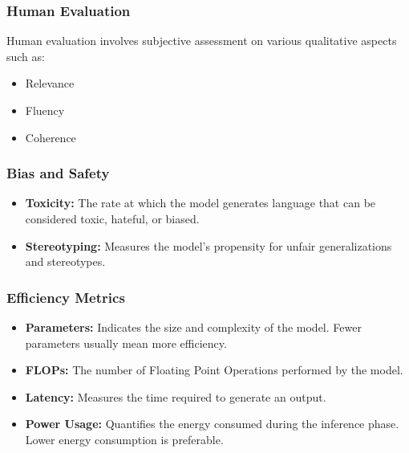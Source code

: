 \subsubsection{Human Evaluation}

Human evaluation involves subjective assessment on various qualitative aspects such as:

\begin{itemize}
    \item Relevance
    \item Fluency
    \item Coherence
\end{itemize}

\subsubsection{Bias and Safety}

\begin{itemize}
    \item \textbf{Toxicity:} The rate at which the model generates language that can be considered toxic, hateful, or biased.
    \item \textbf{Stereotyping:} Measures the model's propensity for unfair generalizations and stereotypes.
\end{itemize}

\subsubsection{Efficiency Metrics}

\begin{itemize}
    \item \textbf{Parameters:} Indicates the size and complexity of the model. Fewer parameters usually mean more efficiency.
    \item \textbf{FLOPs:} The number of Floating Point Operations performed by the model.
    \item \textbf{Latency:} Measures the time required to generate an output.
    \item \textbf{Power Usage:} Quantifies the energy consumed during the inference phase. Lower energy consumption is preferable.
\end{itemize}
